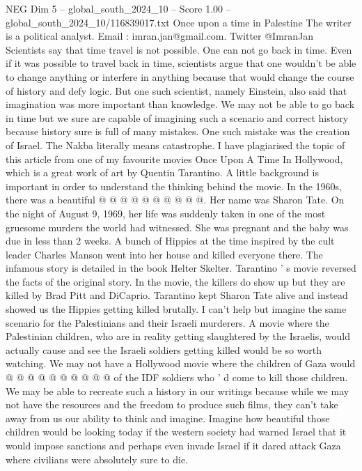 \begin{textsample}{NEG Dim 5 – global\_south\_2024\_10 – Score 1.00 – global\_south\_2024\_10/116839017.txt}  \label{ex:f5_neg_106}
Once upon a time in Palestine The writer is a political analyst.
Email : imran.jan@gmail.com.
Twitter @ImranJan Scientists say that time travel is not possible.
One can not go back in time.
Even if it was possible to travel back in time, scientists argue that one wouldn't be able to change anything or interfere in anything because that would change the course of history and defy logic.
But one such scientist, namely Einstein, also said that imagination was more important than knowledge.
We may not be able to go back in time but we sure are capable of imagining such a scenario and correct history because history sure is full of many mistakes.
One such mistake was the creation of Israel.
The Nakba literally means catastrophe.
I have plagiarised the topic of this article from one of my favourite movies Once Upon A Time In Hollywood, which is a great work of art by Quentin Tarantino.
A little background is important in order to understand the thinking behind the movie.
In the 1960s, there was a beautiful @ @ @ @ @ @ @ @ @ @.
Her name was Sharon Tate.
On the night of August 9, 1969, her life was suddenly taken in one of the most gruesome murders the world had witnessed.
She was pregnant and the baby was due in less than 2 weeks.
A bunch of Hippies at the time inspired by the cult leader Charles Manson went into her house and killed everyone there.
The infamous story is detailed in the book Helter Skelter.
Tarantino ' s movie reversed the facts of the original story.
In the movie, the killers do show up but they are killed by Brad Pitt and DiCaprio.
Tarantino kept Sharon Tate alive and instead showed us the Hippies getting killed brutally.
I can't help but imagine the same scenario for the Palestinians and their Israeli murderers.
A movie where the Palestinian children, who are in reality getting slaughtered by the Israelis, would actually cause and see the Israeli soldiers getting killed would be so worth watching.
We may not have a Hollywood movie where the children of Gaza would @ @ @ @ @ @ @ @ @ @ of the IDF soldiers who ' d come to kill those children.
We may be able to recreate such a history in our writings because while we may not have the resources and the freedom to produce such films, they can't take away from us our ability to think and imagine.
Imagine how beautiful those children would be looking today if the western society had warned Israel that it would impose sanctions and perhaps even invade Israel if it dared attack Gaza where civilians were absolutely sure to die.

\end{textsample}
